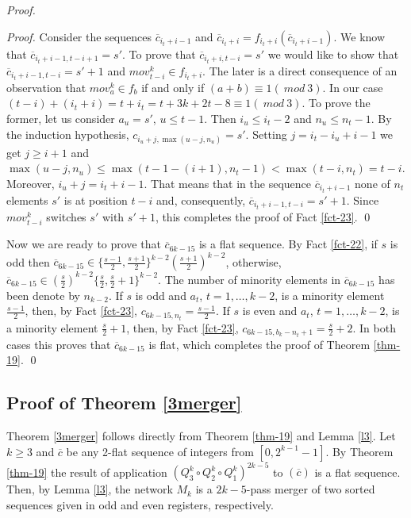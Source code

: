 \documentclass{llncs}
\begin{document}
\begin{proof}
\begin{proof}
Consider the sequences $\overline{c}_{i_t+i-1}$ and $\overline{c}_{i_t+i} =
f_{i_t+i}(\overline{c}_{i_t+i-1})$. We know that $\overline{c}_{i_t+i-1,t-i+1}
= s'$. To prove that $\overline{c}_{i_t+i,t-i} = s'$ we would like to show 
that $\overline{c}_{i_t+i-1,t-i} = s'+1$ and $mov^k_{t-i}\in f_{i_t+i}$. The 
later is a direct consequence of an observation that $mov^k_a\in f_b$ if and 
only if $(a+b)\equiv 1 (~mod~3)$. In our case $(t-i) + (i_t+i) = t+i_t = t + 
3k + 2t - 8 \equiv 1 (~mod~3)$. To prove the former, let us consider $a_u = 
s'$, $u\le t-1$. Then $i_u \le i_t-2$ and $n_u \le n_t-1$. By the induction 
hypothesis, $c_{i_u+j,\max(u-j,n_u)} = s'$. Setting $j = i_t - i_u + i-1$ we 
get $j\ge i+1$ and $\max(u-j,n_u) \le \max(t-1-(i+1),n_t-1) < \max(t-i,n_t) = 
t-i$. Moreover, $i_u+j = i_t+i-1$. That means that in the sequence  
$\overline{c}_{i_t+i-1}$ none of $n_t$ elements $s'$ is at position $t-i$ 
and, consequently, $\overline{c}_{i_t+i-1,t-i} = s'+1$. Since $mov^k_{t-i}$ 
switches $s'$ with $s'+1$, this completes the proof of Fact \ref{fct-23}.  \qed
\end{proof}
Now we are ready to prove that $\overline{c}_{6k-15}$ is a flat sequence. By
Fact \ref{fct-22}, if $s$ is odd then $\overline{c}_{6k-15} \in
\{\frac{s-1}{2},\frac{s+1}{2}\}^{k-2}(\frac{s+1}{2})^{k-2}$, otherwise,
$\overline{c}_{6k-15} \in
(\frac{s}{2})^{k-2}\{\frac{s}{2},\frac{s}{2}+1\}^{k-2}$. The number of minority
elements in $\overline{c}_{6k-15}$ has been denote by $n_{k-2}$. If $s$ is odd
and $a_t$, $t = 1, \ldots, k-2$, is a minority element $\frac{s-1}{2}$, then, by
Fact \ref{fct-23}, $c_{6k-15,n_t} = \frac{s-1}{2}$. If $s$ is even and $a_t$, $t
= 1, \ldots, k-2$, is a minority element $\frac{s}{2}+1$, then, by Fact
\ref{fct-23}, $c_{6k-15,b_k-n_t+1} = \frac{s}{2}+2$. In both cases this proves
that  $\overline{c}_{6k-15}$ is flat, which completes the proof of Theorem
\ref{thm-19}. \qed
\end{proof}

\subsection{Proof of Theorem \ref{3merger}}  

Theorem \ref{3merger} follows directly from Theorem \ref{thm-19} and Lemma
\ref{l3}. Let $k\ge 3$ and $\overline{c}$ be any 2-flat sequence of integers
from $[0,2^{k-1}-1]$. By Theorem \ref{thm-19} the result of application
$(Q^k_3\circ Q^k_2\circ Q^k_1)^{2k-5}$ to $(\overline{c})$ is a flat sequence.
Then, by Lemma \ref {l3}, the network $M_k$ is a $2k-5$-pass merger of two 
sorted sequences given in odd and even registers, respectively.
\end{document}
